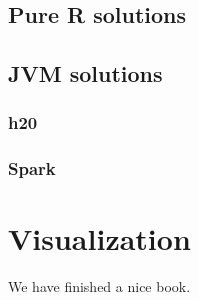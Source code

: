 \documentclass[]{book}
\theoremstyle{definition}
\theoremstyle{definition}
\theoremstyle{definition}
\theoremstyle{remark}
\begin{document}
\section{Pure R solutions}\label{pure-r-solutions}

\section{JVM solutions}\label{jvm-solutions}

\subsection{h20}\label{h20}

\subsection{Spark}\label{spark}

\chapter{Visualization}\label{visualization}

We have finished a nice book.


\end{document}

